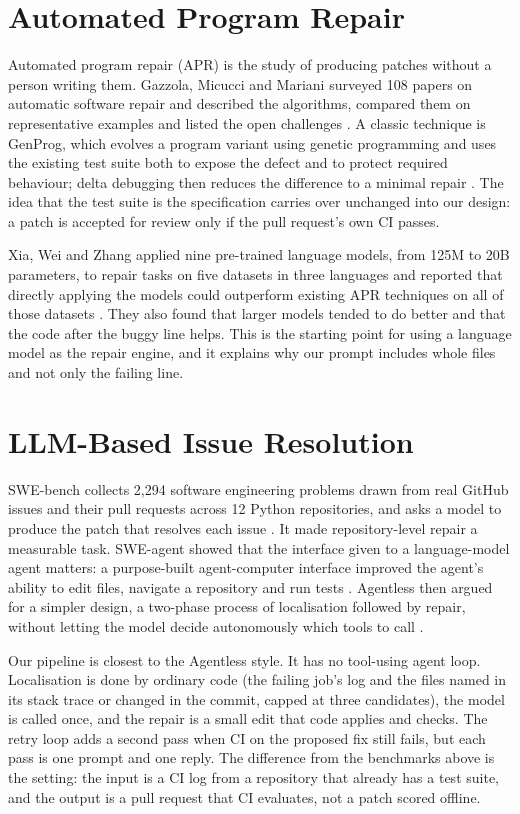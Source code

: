 \section{Automated Program Repair}
Automated program repair (APR) is the study of producing patches without a person writing them. Gazzola, Micucci and Mariani surveyed 108 papers on automatic software repair and described the algorithms, compared them on representative examples and listed the open challenges \cite{gazzola17}. A classic technique is GenProg, which evolves a program variant using genetic programming and uses the existing test suite both to expose the defect and to protect required behaviour; delta debugging then reduces the difference to a minimal repair \cite{legoues12}. The idea that the test suite is the specification carries over unchanged into our design: a patch is accepted for review only if the pull request's own CI passes.

Xia, Wei and Zhang applied nine pre-trained language models, from 125M to 20B parameters, to repair tasks on five datasets in three languages and reported that directly applying the models could outperform existing APR techniques on all of those datasets \cite{xia23}. They also found that larger models tended to do better and that the code after the buggy line helps. This is the starting point for using a language model as the repair engine, and it explains why our prompt includes whole files and not only the failing line.

\section{LLM-Based Issue Resolution}
SWE-bench collects 2,294 software engineering problems drawn from real GitHub issues and their pull requests across 12 Python repositories, and asks a model to produce the patch that resolves each issue \cite{jimenez24}. It made repository-level repair a measurable task. SWE-agent showed that the interface given to a language-model agent matters: a purpose-built agent-computer interface improved the agent's ability to edit files, navigate a repository and run tests \cite{yang24}. Agentless then argued for a simpler design, a two-phase process of localisation followed by repair, without letting the model decide autonomously which tools to call \cite{xia25}.

Our pipeline is closest to the Agentless style. It has no tool-using agent loop. Localisation is done by ordinary code (the failing job's log and the files named in its stack trace or changed in the commit, capped at three candidates), the model is called once, and the repair is a small edit that code applies and checks. The retry loop adds a second pass when CI on the proposed fix still fails, but each pass is one prompt and one reply. The difference from the benchmarks above is the setting: the input is a CI log from a repository that already has a test suite, and the output is a pull request that CI evaluates, not a patch scored offline.

